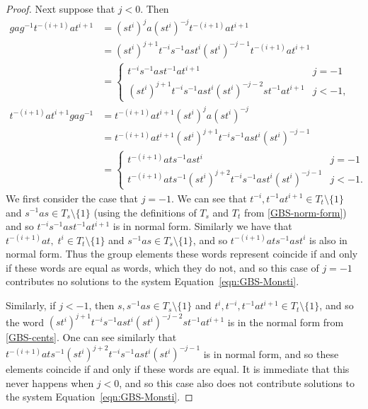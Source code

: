 \documentclass[10pt,a4paper]{amsart}
\begin{document}
\begin{proof}
	Next suppose that \(j <
			0\).  Then
			\begin{align*}
					gag^{-1} t^{-(i + 1)} a t^{i + 1} & = (st^i)^j a (st^i)^{-j} t^{-(i + 1)} a t^{i + 1} \\
										& = (st^i)^{j + 1} t^{-i} s^{-1} a s
										t^i (st^i)^{-j - 1} t^{-(i + 1)} a t^{i + 1}
										\\
										& = 
										\begin{cases}
										t^{-i} s^{-1} a s
										 t^{-1} a t^{i + 1} & j = -1 \\
										(st^i)^{j + 1} t^{-i} s^{-1} a s
										t^i (st^i)^{-j -2} s t^{-1} a t^{i + 1}
										& j < -1,
										\end{cases}
										\\
										t^{-(i + 1)} a t^{i + 1} gag^{-1}
										& = t^{-(i + 1)} a t^{i + 1}
										(st^i)^j a (st^i)^{-j} \\
										& = t^{-(i + 1)} a t^{i + 1}
										(st^i)^{j + 1} t^{-i} s^{-1} a s
								t^i (st^i)^{-j - 1} \\
										& = \begin{cases}
										t^{-(i + 1)} a t s^{-1} a s t^i & j = -1 \\
										t^{-(i + 1)} a t s^{-1}
										(st^i)^{j + 2} t^{-i} s^{-1} a s
								t^i (st^i)^{-j - 1} 
																		& j < -1.
										\end{cases}
			\end{align*}
			We first consider the case that \(j = -1\). We can see that
			\(t^{-i}, t^{-1} a t^{i + 1} \in T_t \setminus \{1\}\) and \(s^{-1}
			a s\in T_s \setminus \{1\}\) (using the definitions of \(T_s\) and
			\(T_t\) from \cref{GBS-norm-form}) and so \(t^{-i} s^{-1} a s
			t^{-1} a t^{i + 1}\) is in normal form. Similarly we have that
			\(t^{-(i + 1)} a t, \; t^i \in T_t \setminus \{1\}\) and
			\(s^{-1} a s \in T_s \setminus \{1\}\), and so
			\(t^{-(i + 1)} a t s^{-1} a st^i\) is also in normal form.
			Thus the group elements these words represent coincide
			if and only if these words are equal as words, which they do not,
			and so this case of \(j = -1\) contributes no solutions to
			the system Equation~\eqref{eqn:GBS-Monsti}.

			Similarly, if \(j < -1\), then \(s, s^{-1} as \in T_s \setminus
			\{1\}\) and \(t^i, t^{-i}, t^{-1} a t^{i + 1} \in T_t \setminus
			\{1\}\), and so the word \((st^i)^{j + 1} t^{-i} s^{-1} a s t^i
			(st^i)^{-j -2} s t^{-1} a t^{i + 1}\) is in the normal form from
			\cref{GBS-cents}. One can see similarly that \(t^{-(i + 1)} a t
			s^{-1} (st^i)^{j + 2} t^{-i} s^{-1} a s t^i (st^i)^{-j - 1}\) is in
			normal form, and so these elements coincide if and only if these
			words are equal. It is immediate that this never happens when \(j <
			0\), and so this case also does not contribute solutions to the
			system Equation~\eqref{eqn:GBS-Monsti}.


\end{proof}
\end{document}
